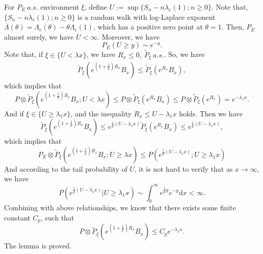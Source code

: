 \documentclass[]{article}
\makeatletter
\numberwithin{equation}{section}
\renewenvironment{proof}[1][\proofname]{%
	\par\pushQED{\qed}\normalfont%
	\topsep6\p@\@plus6\p@\relax
	\trivlist\item[\hskip\labelsep\bfseries#1\@addpunct{.}]%
	\ignorespaces
}{%
	\popQED\endtrivlist\@endpefalse
}
\theoremstyle{thmstyleone}%
\theoremstyle{thmstyletwo}%
\theoremstyle{thmstylethree}%
\theoremstyle{thmstylefour}%
\theoremstyle{thmstylefive}%
\theoremstyle{thmstylesix}%
\renewcommand{\d}{\mathrm{d}}
\makeatother
\begin{document}
\begin{proof}[Proof of \Cref{Modified Upper Estimate}]
		For $P_E~a.s.$ environment $\xi$, 
		define $U:=\sup\{S_n-n\lambda_e(1);n\geqslant 0\}$.
		Note that, $\{S_n-n\lambda_e(1);n\geqslant 0\}$ is a random walk with log-Laplace exponent $ \overline{\Lambda}(\theta)=\Lambda_e(\theta)-\theta \Lambda_e(1) $, which has a positive zero point at $\theta=1$.
		Then, $P_E$ almost surely, we have $U<\infty$. 
		Moreover, we have
		\begin{equation*}
			P_E(U\geqslant y) \sim e^{-y}.
		\end{equation*}
		Note that, if $\xi\in \{U <\lambda x\}$, we have $R_x\leqslant 0,~ \tilde{P}_\xi~a.s.$. So, we have
		\begin{align*}
			\tilde{P}_\xi(e^{(1+\frac{1}{p})R_x}B_x)
			\leqslant\tilde{P}_\xi(e^{R_x}B_x),
		\end{align*}
		which implies that
		\begin{equation*}
			P\otimes \tilde{P}_\xi (e^{(1+\frac{1}{p})R_x}B_x;U<\lambda x)\leqslant
			P\otimes \tilde{P}_\xi (e^{R_x}B_x)\leqslant P\otimes \tilde{P}_\xi (e^{R_x})=e^{-\lambda_1 x}.
		\end{equation*}
		And if $\xi\in \{U\geqslant \lambda_1 x\}$, and the inequality $R_x\leqslant U-\lambda_1 x$ holds. Then we have
		\begin{equation*}
			\tilde{P}_\xi(e^{(1+\frac{1}{p})R_x}B_x)
			\leqslant e^{\frac{1}{p}(U-\lambda_1x)}
			\tilde{P}_\xi(e^{R_x}B_x)\leqslant e^{\frac{1}{p}(U-\lambda_1x)},
		\end{equation*}
		which implies that
		\begin{equation*}
			P_E\otimes \tilde{P}_\xi (e^{(1+\frac{1}{p})R_x}B_x;U\geqslant\lambda x)\leqslant
			P\left( e^{\frac{1}{p}(U-\lambda_1 x)};U\geqslant \lambda_1 x \right)
		\end{equation*}
		And according to the tail probability of $U$, it is not hard to verify that as $x\rightarrow\infty$, we have
		\begin{equation*}
			P\left( e^{\frac{1}{p}(U-\lambda_1 x)} |U\geqslant \lambda_1 x \right) \sim \int_{0}^{\infty} e^{\frac{1}{p}y} e^{-y} \d x <\infty.
		\end{equation*}
		Combining with above relationships, we know that there exists some finite constant $C_p$, such that
		\begin{equation*}
			P\otimes \tilde{P}_\xi\left(e^{\left(1+\frac{1}{p}\right)R_x}B_x\right)
			\leqslant C_p e^{-\lambda_1 x}.
		\end{equation*}
		The lemma is proved.
	\end{proof}
	
\end{document}
